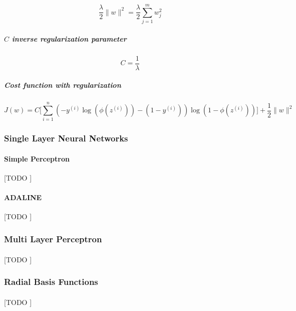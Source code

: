 \documentclass{article}
\begin{document}
			\begin{equation}
				\frac{\lambda}{2} \| w\|^2 = \frac{\lambda}{2} \sum_{j=1}^m w_j^2
			\end{equation}
			
			\subparagraph{$C$ inverse regularization parameter}
			
			\begin{equation}
				C = \frac{1}{\lambda}
			\end{equation}
			
			\subparagraph{Cost function with regularization}
			\begin{equation}
				J(w) = C \bigg[ \sum_{i=1}^n (-y^{(i)}\log(\phi(z^{(i)}))-(1-y^{(i)}))\log(1-\phi(z^{(i)})) \bigg] + \frac{1}{2} \|w\|^2
			\end{equation}


			\subsubsection{Single Layer Neural Networks}
			\label{sec:single-layer-nn}


				\paragraph{Simple Perceptron}
				\label{sec:perceptron}
				[TODO ]

				\paragraph{ADALINE}
				\label{sec:adaline}
				[TODO ]

			\subsubsection{Multi Layer Perceptron}
			\label{sec:mlp}

				\paragraph{}
				[TODO ]

			\subsubsection{Radial Basis Functions}
			\label{sec:rbf}

				\paragraph{}
				[TODO ]
\end{document}
